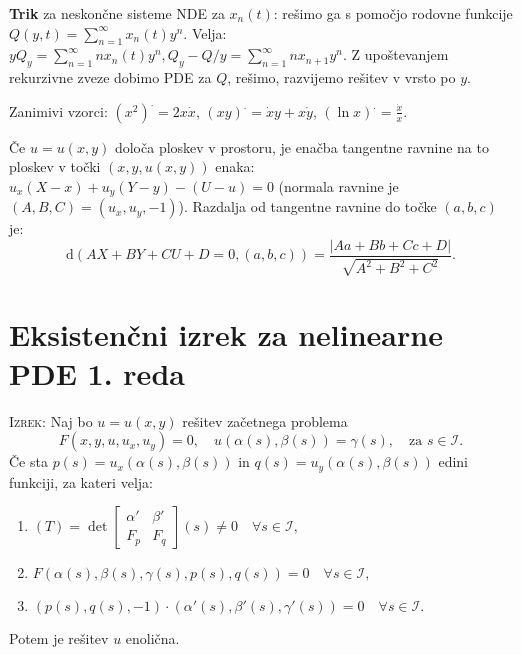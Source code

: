 \documentclass[10pt,a4paper]{amsart}
\theoremstyle{definition} %
\theoremstyle{plain} %
\begin{document}
\thispagestyle{empty}
\setlength{\parindent}{0pt}


\textbf{Trik} za neskončne sisteme NDE za $x_n(t)$: rešimo ga s pomočjo rodovne
funkcije $Q(y,t) = \sum_{n=1}^\infty x_n(t) y^n$. Velja: $yQ_y =
\sum_{n=1}^\infty nx_n(t)y^n, Q_y - Q / y = \sum_{n=1}^\infty nx_{n+1}y^n$.
Z upoštevanjem rekurzivne zveze dobimo PDE za $Q$, rešimo, razvijemo rešitev v
vrsto po $y$.


Zanimivi vzorci: $(x^2)^. = 2x\dot{x}$, $(xy)^. = \dot{x}y + x\dot{y}$,
$(\ln{x})^. = \frac{\dot{x}}{x}$.



Če $u = u(x,y)$ določa ploskev v prostoru, je enačba tangentne ravnine na to
ploskev v točki $(x,y,u(x,y))$ enaka: $u_x (X-x) + u_y (Y-y) - (U-u)=0$ (normala
ravnine je $(A,B,C) = (u_x,u_y,-1)$). Razdalja od tangentne ravnine do točke
$(a,b,c)$ je: $$ \text{d}(AX+BY+CU+D=0, (a,b,c)) =
\frac{|Aa+Bb+Cc+D|}{\sqrt{A^2+B^2+C^2}}.  $$


\section*{Eksistenčni izrek za nelinearne PDE 1. reda}

\textsc{Izrek:} Naj bo $u=u(x, y)$ rešitev začetnega problema $$
F(x,y,u,u_x,u_y)=0, \quad u(\alpha(s),\beta(s))=\gamma(s), \quad \text{za } s
\in \mathcal{I}.  $$ Če sta $p(s)=u_x(\alpha(s),\beta(s))$ in $q(s) =
u_y(\alpha(s),\beta(s))$ edini funkciji, za kateri velja: \begin{enumerate}
  \item $ (T) = \det{\begin{bmatrix} \alpha' & \beta' \\ F_p & F_q
  \end{bmatrix}}(s) \neq 0 \quad \forall s \in \mathcal{I},$ \item
    $F(\alpha(s),\beta(s),\gamma(s),p(s),q(s))=0 \quad \forall s \in
    \mathcal{I},$ \item $(p(s),q(s),-1) \cdot (\alpha'(s),\beta'(s),\gamma'(s))
      = 0 \quad \forall s \in \mathcal{I}.$ \end{enumerate} Potem je rešitev $u$
  enolična.



\end{document}
